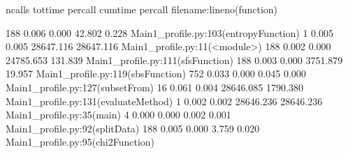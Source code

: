 ncalls  tottime  percall  cumtime  percall filename:lineno(function)

188    0.006    0.000   42.802    0.228 Main1_profile.py:103(entropyFunction)
  1    0.005    0.005 28647.116 28647.116 Main1_profile.py:11(<module>)
188    0.002    0.000 24785.653  131.839 Main1_profile.py:111(sfsFunction)
188    0.003    0.000 3751.879   19.957 Main1_profile.py:119(sbsFunction)
752    0.033    0.000    0.045    0.000 Main1_profile.py:127(subsetFrom)
 16    0.061    0.004 28646.085 1790.380 Main1_profile.py:131(evaluateMethod)
  1    0.002    0.002 28646.236 28646.236 Main1_profile.py:35(main)
  4    0.000    0.000    0.002    0.001 Main1_profile.py:92(splitData)
188    0.005    0.000    3.759    0.020 Main1_profile.py:95(chi2Function)
